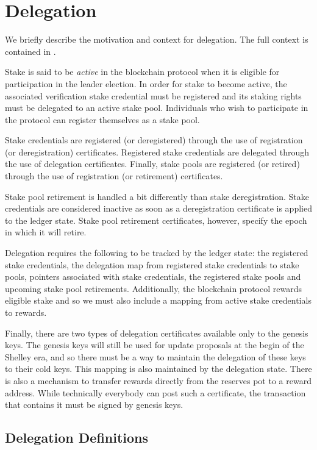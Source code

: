 \section{Delegation}
\label{sec:delegation-shelley}

We briefly describe the motivation and context for delegation.
The full context is contained in \cite{delegation_design}.

Stake is said to be \textit{active} in the blockchain protocol when it is
eligible for participation in the leader election. In order for stake to become
active, the associated verification stake credential must be registered and its
staking rights must be delegated to an active stake pool. Individuals who wish
to participate in the protocol can register themselves as a stake pool.

Stake credentials are registered (or deregistered) through the use of
registration (or deregistration) certificates. Registered stake credentials are
delegated through the use of delegation certificates.  Finally, stake pools are
registered (or retired) through the use of registration (or retirement)
certificates.

Stake pool retirement is handled a bit differently than stake deregistration.
Stake credentials are considered inactive as soon as a deregistration
certificate is applied to the ledger state.  Stake pool retirement certificates,
however, specify the epoch in which it will retire.

Delegation requires the following to be tracked by the ledger state: the
registered stake credentials, the delegation map from registered stake
credentials to stake pools, pointers associated with stake credentials, the
registered stake pools and upcoming stake pool retirements.  Additionally, the
blockchain protocol rewards eligible stake and so we must also include a mapping
from active stake credentials to rewards.

Finally, there are two types of delegation certificates available only to the
genesis keys. The genesis keys will still be used for update proposals at the
begin of the Shelley era, and so there must be a way to maintain the delegation
of these keys to their cold keys.  This mapping is also maintained by the
delegation state. There is also a mechanism to transfer rewards directly from
the reserves pot to a reward address. While technically everybody can post such
a certificate, the transaction that contains it must be signed by genesis keys.

\subsection{Delegation Definitions}
\label{sec:deleg-defs}

